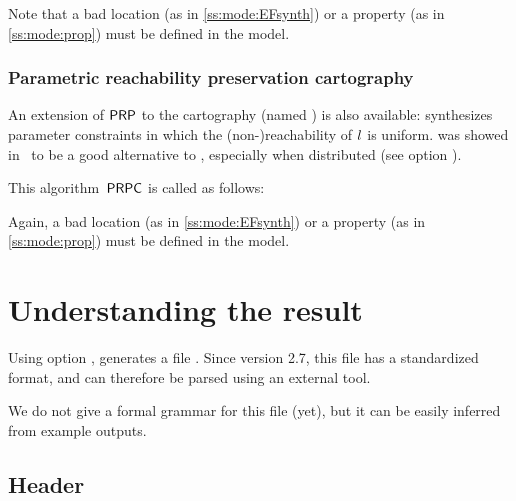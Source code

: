Note that a bad location (as in \cref{ss:mode:EFsynth}) or a property (as in \cref{ss:mode:prop}) must be defined in the model.


\subsection*{Parametric reachability preservation cartography}

An extension of $\mathsf{PRP}$ to the cartography (named \PRPC{}) is also available: \PRPC{} synthesizes parameter constraints in which the (non-)reachability of $l$ is uniform.
\PRPC{} was showed in~\cite{ALNS15} to be a good alternative to \EFsynth{}, especially when distributed (see option ).

This algorithm~$\mathsf{PRPC}$ is called as follows:


Again, a bad location (as in \cref{ss:mode:EFsynth}) or a property (as in \cref{ss:mode:prop}) must be defined in the model.





\chapter{Understanding the \imitator{} result}\label{chapter:result}

Using option , \imitator{} generates a file .
Since version 2.7, this file has a standardized format, and can therefore be parsed using an external tool.

We do not give a formal grammar for this file (yet), but it can be easily inferred from example outputs.


\section{Header}

